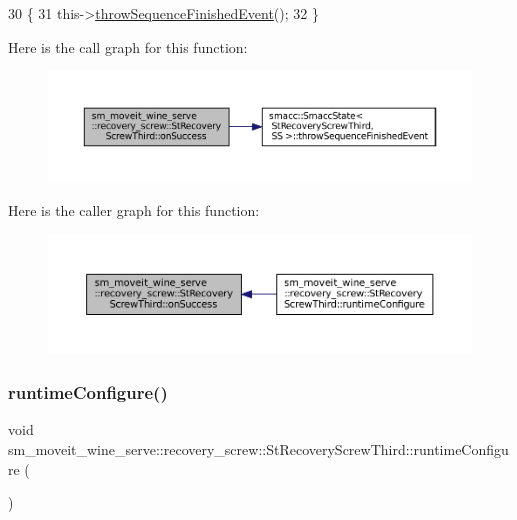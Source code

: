 \begin{DoxyCode}
30             \{
31                 this->\hyperlink{classsmacc_1_1SmaccState_a49dcfc25824f7e083dd4b999c49ab2b6}{throwSequenceFinishedEvent}();
32             \}
\end{DoxyCode}
Here is the call graph for this function\+:
\nopagebreak
\begin{figure}[H]
\begin{center}
\leavevmode
\includegraphics[width=350pt]{structsm__moveit__wine__serve_1_1recovery__screw_1_1StRecoveryScrewThird_a2bbe0e017dd3c7441be93c1911e46614_cgraph}
\end{center}
\end{figure}
Here is the caller graph for this function\+:
\nopagebreak
\begin{figure}[H]
\begin{center}
\leavevmode
\includegraphics[width=350pt]{structsm__moveit__wine__serve_1_1recovery__screw_1_1StRecoveryScrewThird_a2bbe0e017dd3c7441be93c1911e46614_icgraph}
\end{center}
\end{figure}
\mbox{\label{structsm__moveit__wine__serve_1_1recovery__screw_1_1StRecoveryScrewThird_a4be2a6422f6583624108f81cbcf95206}} 
\subsubsection{\texorpdfstring{runtime\+Configure()}{runtimeConfigure()}}
{\footnotesize\ttfamily void sm\+\_\+moveit\+\_\+wine\+\_\+serve\+::recovery\+\_\+screw\+::\+St\+Recovery\+Screw\+Third\+::runtime\+Configure (\begin{DoxyParamCaption}{ }\end{DoxyParamCaption})\hspace{0.3cm}{\ttfamily [inline]}}



